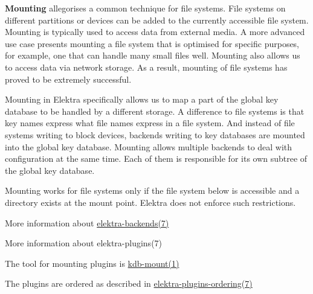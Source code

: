 {\bfseries Mounting} allegorises a common technique for file systems. File systems on different partitions or devices can be added to the currently accessible file system. Mounting is typically used to access data from external media. A more advanced use case presents mounting a file system that is optimised for specific purposes, for example, one that can handle many small files well. Mounting also allows us to access data via network storage. As a result, mounting of file systems has proved to be extremely successful.

Mounting in Elektra specifically allows us to map a part of the global key database to be handled by a different storage. A difference to file systems is that key names express what file names express in a file system. And instead of file systems writing to block devices, backends writing to key databases are mounted into the global key database. Mounting allows multiple backends to deal with configuration at the same time. Each of them is responsible for its own subtree of the global key database.

Mounting works for file systems only if the file system below is accessible and a directory exists at the mount point. Elektra does not enforce such restrictions.


\begin{DoxyItemize}
\item More information about \hyperlink{md_doc_help_elektra-backends_doc_help_elektra-backends_md}{elektra-\/backends(7)}
\item More information about elektra-\/plugins(7)
\item The tool for mounting plugins is \hyperlink{md_doc_help_kdb-mount_doc_help_kdb-mount_md}{kdb-\/mount(1)}
\item The plugins are ordered as described in \hyperlink{md_doc_help_elektra-plugins-ordering_doc_help_elektra-plugins-ordering_md}{elektra-\/plugins-\/ordering(7)} 
\end{DoxyItemize}